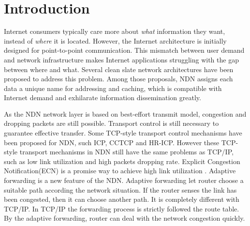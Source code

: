 
\section{Introduction}


Internet consumers typically care more about \emph{what} information they want, instead of \emph{where} it is located. However, the Internet architecture is initially designed for point-to-point communication. This mismatch between user demand and network infrastructure makes Internet applications struggling with the gap between where and what. Several clean slate network architectures have been proposed to address this problem. Among those proposals, NDN\cite{NDN} assigns each data a unique name for addressing and caching, which is compatible with Internet demand and exhilarate information dissemination greatly.

As the NDN network layer is based on best-effort transmit model, congestion and dropping packets are still possible. Transport control is still necessary to guarantee effective transfer. Some TCP-style transport control mechanisms have been proposed for NDN, such ICP\cite{ICP}, CCTCP\cite{CCTCP} and HR-ICP\cite{shape}. However these TCP-style transport mechanisms in NDN still have the same problems as TCP/IP, such as low link utilization and high packets dropping rate. Explicit Congestion Notification(ECN) is a promise way to achieve high link utilization\cite{XCP} . Adaptive forwarding is a new feature of the NDN\cite{Adaptive}. Adaptive forwarding let router choose a suitable path according the network situation. If the router senses the link has been congested, then it can choose another path. It is completely different with TCP/IP. In TCP/IP the forwarding process is strictly followed the route table. By the adaptive forwarding, router can deal with the network congestion quickly.

